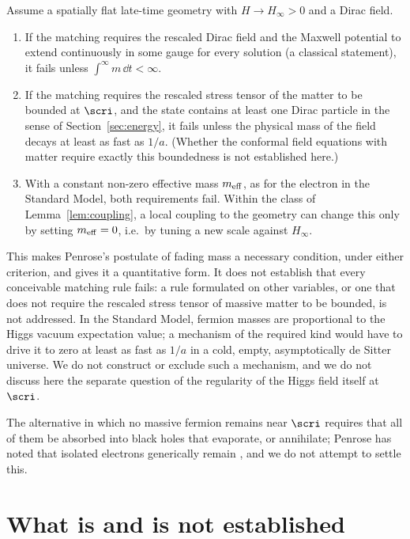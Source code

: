 \begin{proposition}
\label{prop:ccc}
Assume a spatially flat late-time geometry with $H\to H_{\infty}>0$ and a Dirac field.
\begin{enumerate}[label=(\alph*)]
\item If the matching requires the rescaled Dirac field and the Maxwell potential to extend continuously in some gauge for every solution (a classical statement), it fails unless $\int^{\infty}m\,\dd t<\infty$.
\item If the matching requires the rescaled stress tensor of the matter to be bounded at $\scri$, and the state contains at least one Dirac particle in the sense of Section~\ref{sec:energy}, it fails unless the physical mass of the field decays at least as fast as $1/a$. (Whether the conformal field equations with matter require exactly this boundedness is not established here.)
\item With a constant non-zero effective mass $m_{\rm eff}$, as for the electron in the Standard Model, both requirements fail. Within the class of Lemma~\ref{lem:coupling}, a local coupling to the geometry can change this only by setting $m_{\rm eff}=0$, i.e.\ by tuning a new scale against $H_{\infty}$.
\end{enumerate}
\end{proposition}

This makes Penrose's postulate of fading mass a necessary condition, under either criterion, and gives it a quantitative form. It does not establish that every conceivable matching rule fails: a rule formulated on other variables, or one that does not require the rescaled stress tensor of massive matter to be bounded, is not addressed. In the Standard Model, fermion masses are proportional to the Higgs vacuum expectation value; a mechanism of the required kind would have to drive it to zero at least as fast as $1/a$ in a cold, empty, asymptotically de Sitter universe. We do not construct or exclude such a mechanism, and we do not discuss here the separate question of the regularity of the Higgs field itself at $\scri$.

The alternative in which no massive fermion remains near $\scri$ requires that all of them be absorbed into black holes that evaporate, or annihilate; Penrose has noted that isolated electrons generically remain \cite{Penrose2010}, and we do not attempt to settle this.

\section{What is and is not established}
\label{sec:scope}

